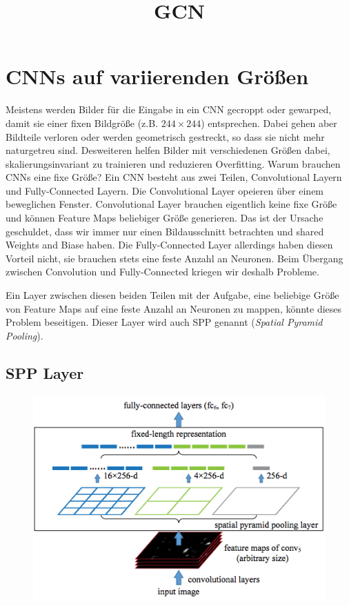 \documentclass{scrartcl}
\title{GCN}
\begin{document}
\maketitle

\section{CNNs auf variierenden Größen}

Meistens werden Bilder für die Eingabe in ein CNN gecroppt oder gewarped, damit sie einer fixen Bildgröße (z.B. $244 \times 244$) entsprechen.
Dabei gehen aber Bildteile verloren oder werden geometrisch gestreckt, so dass sie nicht mehr naturgetreu sind.
Desweiteren helfen Bilder mit verschiedenen Größen dabei, skalierungsinvariant zu trainieren und reduzieren Overfitting.
Warum brauchen CNNs eine fixe Größe?
Ein CNN besteht aus zwei Teilen, Convolutional Layern und Fully-Connected Layern.
Die Convolutional Layer opeieren über einem beweglichen Fenster.
Convolutional Layer brauchen eigentlich keine fixe Größe und können Feature Maps beliebiger Größe generieren.
Das ist der Ursache geschuldet, dass wir immer nur einen Bildausschnitt betrachten und shared Weights and Biase haben.
Die Fully-Connected Layer allerdings haben diesen Vorteil nicht, sie brauchen stets eine feste Anzahl an Neuronen.
Beim Übergang zwischen Convolution und Fully-Connected kriegen wir deshalb Probleme.

Ein Layer zwischen diesen beiden Teilen mit der Aufgabe, eine beliebige Größe von Feature Maps auf eine feste Anzahl an Neuronen zu mappen, könnte dieses Problem beseitigen.
Dieser Layer wird auch SPP genannt (\emph{Spatial Pyramid Pooling}).

\subsection{SPP Layer}

\begin{figure}[h]
  \centering
  \includegraphics[width=.6\textwidth]{images/spp}
\end{figure}
\end{document}
